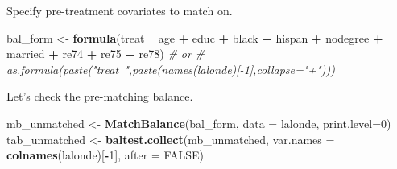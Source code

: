 \documentclass[ignorenonframetext,]{beamer}
\newenvironment{Shaded}{\begin{snugshade}}{\end{snugshade}}
\newcommand{\KeywordTok}[1]{\textcolor[rgb]{0.13,0.29,0.53}{\textbf{#1}}}
\newcommand{\DataTypeTok}[1]{\textcolor[rgb]{0.13,0.29,0.53}{#1}}
\newcommand{\DecValTok}[1]{\textcolor[rgb]{0.00,0.00,0.81}{#1}}
\newcommand{\StringTok}[1]{\textcolor[rgb]{0.31,0.60,0.02}{#1}}
\newcommand{\CommentTok}[1]{\textcolor[rgb]{0.56,0.35,0.01}{\textit{#1}}}
\newcommand{\OtherTok}[1]{\textcolor[rgb]{0.56,0.35,0.01}{#1}}
\newcommand{\OperatorTok}[1]{\textcolor[rgb]{0.81,0.36,0.00}{\textbf{#1}}}
\newcommand{\NormalTok}[1]{#1}
\begin{document}
\begin{frame}[fragile]

\small
Specify pre-treatment covariates to match on.

\begin{Shaded}
\begin{Highlighting}[]
\NormalTok{bal_form <-}\StringTok{ }\KeywordTok{formula}\NormalTok{(treat }\OperatorTok{~}\StringTok{ }\NormalTok{age }\OperatorTok{+}\StringTok{ }\NormalTok{educ }\OperatorTok{+}\StringTok{ }\NormalTok{black }\OperatorTok{+}\StringTok{ }\NormalTok{hispan }\OperatorTok{+}\StringTok{ }
\StringTok{                      }\NormalTok{nodegree }\OperatorTok{+}\StringTok{ }\NormalTok{married }\OperatorTok{+}\StringTok{ }\NormalTok{re74 }\OperatorTok{+}\StringTok{ }\NormalTok{re75 }\OperatorTok{+}\StringTok{ }\NormalTok{re78)}
\CommentTok{# or}
\CommentTok{# as.formula(paste("treat~",paste(names(lalonde)[-1],collapse="+")))}
\end{Highlighting}
\end{Shaded}

\normalsize

Let's check the pre-matching balance.

\small

\begin{Shaded}
\begin{Highlighting}[]
\NormalTok{mb_unmatched <-}\StringTok{ }\KeywordTok{MatchBalance}\NormalTok{(bal_form, }
                             \DataTypeTok{data =}\NormalTok{ lalonde, }\DataTypeTok{print.level=}\DecValTok{0}\NormalTok{)}
\NormalTok{tab_unmatched <-}\StringTok{ }\KeywordTok{baltest.collect}\NormalTok{(mb_unmatched, }
                                 \DataTypeTok{var.names =} \KeywordTok{colnames}\NormalTok{(lalonde)[}\OperatorTok{-}\DecValTok{1}\NormalTok{], }
                                 \DataTypeTok{after =} \OtherTok{FALSE}\NormalTok{)}
\end{Highlighting}
\end{Shaded}

\normalsize

\end{frame}
\end{document}

